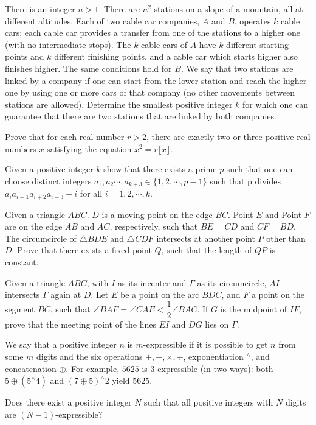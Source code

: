 \documentclass[11pt]{scrartcl}
\begin{document}
\begin{problem}[695330092247108707]
There is an integer $n > 1$. There are $n^2$ stations on a slope of a mountain, all at different altitudes. Each of two cable car companies, $A$ and $B$, operates $k$ cable cars; each cable car provides a transfer from one of the stations to a higher one (with no intermediate stops). The $k$ cable cars of $A$ have $k$ different starting points and $k$ different finishing points, and a cable car which starts higher also finishes higher. The same conditions hold for $B$. We say that two stations are linked by a company if one can start from the lower station and reach the higher one by using one or more cars of that company (no other movements between stations are allowed). Determine the smallest positive integer $k$ for which one can guarantee that there are two stations that are linked by both companies.
\end{problem}
\begin{problem}[816618498838890]
	Prove that for each real number $r>2$, there are exactly two or three positive real numbers $x$ satisfying the equation $x^2=r\lfloor x \rfloor$.
\end{problem}
\begin{problem}[961350373727093]
Given a positive integer $k$ show that there exists a prime $p$ such that one can choose distinct integers $a_1,a_2\cdots, a_{k+3} \in \{1, 2, \cdots ,p-1\}$ such that p divides $a_ia_{i+1}a_{i+2}a_{i+3}-i$ for all $i= 1, 2, \cdots, k$.
\end{problem}
\begin{problem}[117986541208663]
Given a triangle $ABC$. $D$ is a moving point on the edge $BC$. Point $E$ and Point $F$ are on the edge $AB$ and $AC$, respectively, such that $BE=CD$ and $CF=BD$. The circumcircle of $\triangle BDE$ and $\triangle CDF$ intersects at another point $P$ other than $D$. Prove that there exists a fixed point $Q$, such that the length of $QP$ is constant.
\end{problem}
\begin{problem}[6098711912608423295]
Given a triangle $ABC$, with $I$ as its incenter and $\Gamma$ as its circumcircle, $AI$ intersects $\Gamma$ again at $D$. Let $E$ be a point on the arc $BDC$, and $F$ a point on the segment $BC$, such that $\angle BAF=\angle CAE < \dfrac12\angle BAC$. If $G$ is the midpoint of $IF$, prove that the meeting point of the lines $EI$ and $DG$ lies on $\Gamma$.
\end{problem}
\begin{problem}[822507508246664]
	We say that a positive integer $n$ is $m$-expressible if it is possible to get $n$ from some $m$ digits and the six operations $+,-,\times,\div$, exponentiation $^\wedge$, and concatenation $\oplus$. For example, $5625$ is $3$-expressible (in two ways): both $5\oplus (5^\wedge 4)$ and $(7\oplus 5)^\wedge 2$ yield $5625$.

Does there exist a positive integer $N$ such that all positive integers with $N$ digits are $(N-1)$-expressible?
\end{problem}
\end{document}
